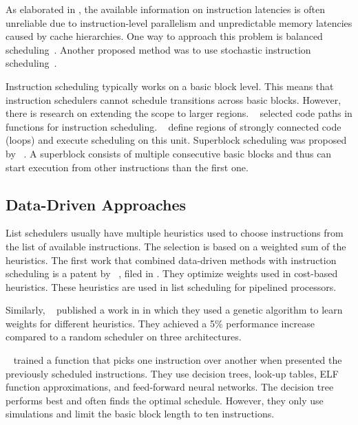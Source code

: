 As elaborated in , the available information on instruction latencies is often unreliable due to instruction-level parallelism and unpredictable memory latencies caused by cache hierarchies.
One way to approach this problem is balanced scheduling~\cite{kerns1993balanced,lo1995improving}.
Another proposed method was to use stochastic instruction scheduling~\cite{schielke2000stochastic}.

Instruction scheduling typically works on a basic block level.
This means that instruction schedulers cannot schedule transitions across basic blocks.
However, there is research on extending the scope to larger regions.
\citeauthor{fisher1981trace}~\cite{fisher1981trace} selected code paths in functions for instruction scheduling.
\citeauthor{bernstein1991global}~\cite{bernstein1991global} define regions of strongly connected code (\eg loops) and execute scheduling on this unit.
Superblock scheduling was proposed by \citeauthor{hwu1993superblock}~\cite{hwu1993superblock}.
A superblock consists of multiple consecutive basic blocks and thus can start execution from other instructions than the first one.

\subsection{Data-Driven Approaches}
List schedulers usually have multiple heuristics used to choose instructions from the list of available instructions.
The selection is based on a weighted sum of the heuristics.
The first work that combined data-driven methods with instruction scheduling is a patent by \citeauthor{tarsy1994method}~\cite{tarsy1994method}, filed in \citeyear{tarsy1994method}.
They optimize weights used in cost-based heuristics.
These heuristics are used in list scheduling for pipelined processors.

Similarly, \citeauthor{beaty1996using}~\cite{beaty1996using} published a work in \citeyear{beaty1996using} in which they used a genetic algorithm to learn weights for different heuristics.
They achieved a 5\% performance increase compared to a random scheduler on three architectures.

\citeauthor{moss1997learning}~\cite{moss1997learning} trained a function that picks one instruction over another when presented the previously scheduled instructions.
They use decision trees, look-up tables, ELF function approximations, and feed-forward neural networks.
The decision tree performs best and often finds the optimal schedule.
However, they only use simulations and limit the basic block length to ten instructions.

